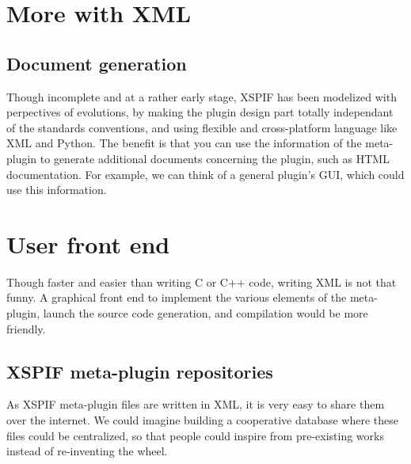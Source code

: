 \section{More with XML}
\subsection{Document generation}
\noindent Though incomplete and at a rather early stage, XSPIF has been modelized with perpectives of evolutions, by making the plugin design part totally independant of the standards conventions, and using flexible and cross-platform language like XML and Python.
\noindent The benefit is that you can use the information of the meta-plugin to generate additional documents concerning the plugin, such as HTML documentation. For example, we can think of a general plugin's GUI, which could use this information.

\section{User front end}
\noindent Though faster and easier than writing C or C++ code, writing XML is not that funny. A graphical front end to implement the various elements of the meta-plugin, launch the source code generation, and compilation would be more friendly.

\subsection{XSPIF meta-plugin repositories}
\noindent As XSPIF meta-plugin files are written in XML, it is very easy to share them over the internet. We could imagine building a cooperative database where these files could be centralized, so that people could inspire from pre-existing works instead of re-inventing the wheel.
